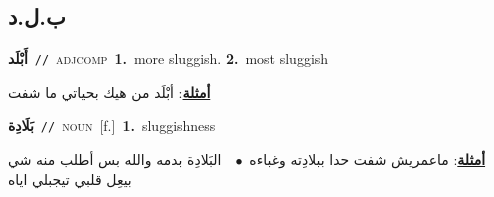 \documentclass[10pt,a4paper,twoside]{article} %
\begin{document}
\begin{multicols}{2}
\vspace{-3mm}
\subsection*{\color{blue}\foreignlanguage{arabic}{ب.ل.د}\color{blue}{}} 

{\setlength\topsep{0pt}\textbf{\foreignlanguage{arabic}{أَبْلَد}}\ {\color{gray}\texttt{//}\color{black}}\ \textsc{adj\textunderscore comp}\ \textbf{1.}~more sluggish.  \textbf{2.}~most sluggish\  \begin{flushright}\color{gray}\foreignlanguage{arabic}{\textbf{\underline{\foreignlanguage{arabic}{أمثلة}}}: أبْلَد من هيك بحياتي ما شفت}\end{flushright}\color{black}} \vspace{2mm}

{\setlength\topsep{0pt}\textbf{\foreignlanguage{arabic}{بَلَادِة}}\ {\color{gray}\texttt{//}\color{black}}\ \textsc{noun}\ [f.]\ \textbf{1.}~sluggishness\  \begin{flushright}\color{gray}\foreignlanguage{arabic}{\textbf{\underline{\foreignlanguage{arabic}{أمثلة}}}: ماعمريش شفت حدا ببلادِته وغباءه\ $\bullet$\ \  البَلادِة بدمه والله بس أطلب منه شي بيعِل قلبي تيجبلي اياه}\end{flushright}\color{black}} \vspace{2mm}


\end{multicols}
\end{document}
